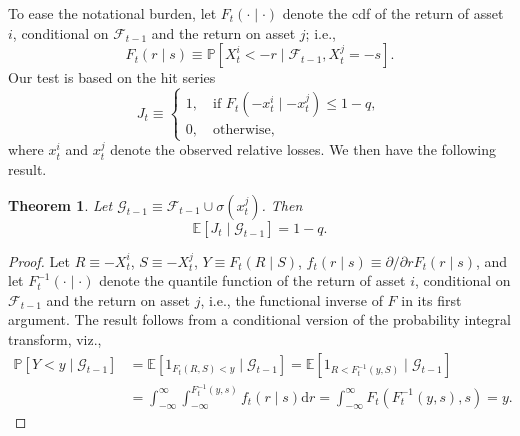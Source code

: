 \documentclass[12pt]{article}
\newtheorem{theorem}{Theorem}
\begin{document}
To ease the notational burden, let $F_t(\cdot\mid\cdot)$ denote the cdf of the return of asset $i$, conditional on $\mathcal{F}_{t-1}$ and the return on asset $j$; i.e.,
\[
 F_t(r\mid s)\equiv \mathbb{P}\left[X^{i}_t<-r\mid \mathcal{F}_{t-1}, X^{j}_t = -s \right].
\]
Our test is based on the hit series
\[
J_t\equiv \begin{cases}1,\quad \mbox{if } F_t (-x^{i}_t\mid -x^{j}_t) \leq 1-q,\\0,\quad \mbox{otherwise,}\end{cases}
\]
where $x^{i}_t$ and $x^{j}_t$ denote the observed relative losses. We then have the following result.
\begin{theorem}\label{th1}
Let $\mathcal{G}_{t-1}\equiv \mathcal{F}_{t-1} \cup \sigma(x^j_t)$. Then
\[\mathbb{E}[J_t\mid \mathcal{G}_{t-1}]=1-q. \]
\end{theorem}
\begin{proof}
Let $R\equiv -X^{i}_t$, $S\equiv -X^{j}_t$, $Y\equiv F_t (R\mid S)$, $f_t(r\mid s)\equiv \partial/\partial r F_t(r\mid s)$, and let $F^{-1}_t(\cdot\mid\cdot)$ denote the quantile function of the return of asset $i$, conditional on $\mathcal{F}_{t-1}$ and the return on asset $j$, i.e., the functional inverse of $F$ in its first argument.  The result follows from a conditional version of the probability integral transform, viz.,
\begin{align*}
\mathbb{P}\left[Y<y\mid \mathcal{G}_{t-1}\right]&=\mathbb{E}\left[1_{F_t(R, S)<y}\mid \mathcal{G}_{t-1}\right]=\mathbb{E}\left[1_{R<F_t^{-1}(y, S)}\mid \mathcal{G}_{t-1}\right]\\
&=\int_{-\infty}^{\infty}\int_{-\infty}^{F_t^{-1}(y, s)}f_t(r\mid s)\mathrm{d}r
=\int_{-\infty}^{\infty}F_t(F^{-1}_t(y, s), s)=y.
\end{align*}\end{proof}
%
\end{document}
